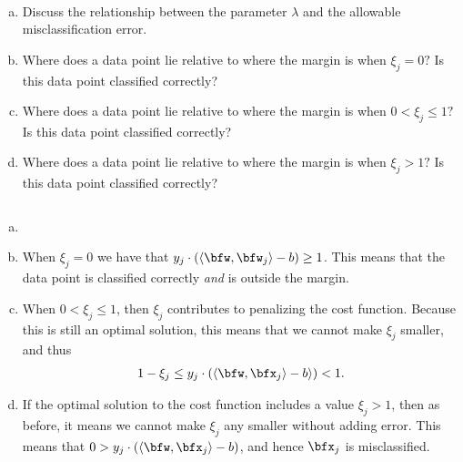 \begin{homework}[e]
\begin{align*}
  \end{align*}
    \begin{enumerate}[(a)]
      \item Discuss the relationship between the parameter $\lambda$ and the allowable misclassification error.
      \item Where does a data point lie relative to where the margin is when $\xi_j = 0?$ Is this data point classified correctly?
      \item Where does a data point lie relative to where the margin is when $0 < \xi_j \leq 1?$ Is this data point classified correctly?
      \item Where does a data point lie relative to where the margin is when $\xi_j > 1?$ Is this data point classified correctly?
    \end{enumerate}
  \begin{prf}$ $
    \begin{enumerate}[(a)]
      \item
      \item When $\xi_j = 0$ we have that $y_j\cdot (\langle \bfw,\bfw_j \rangle - b)\geq 1$. This means that the data point is classified correctly \emph{and} is outside the margin.
      \item When $0 < \xi_j \leq 1$, then $\xi_j$ contributes to penalizing the cost function. Because this is still an optimal solution, this means that we cannot make $\xi_j$ smaller, and thus
        \begin{align*}
          1 - \xi_j \leq y_j\cdot(\langle \bfw,\bfx_j\rangle - b \rangle) < 1.
        \end{align*}
      \item If the optimal solution to the cost function includes a value $\xi_j > 1$, then as before, it means we cannot make $\xi_j$ any smaller without adding error. This means that $0 > y_j\cdot (\langle \bfw,\bfx_j \rangle - b)$, and hence $\bfx_j$ is misclassified.
    \end{enumerate}
  \end{prf}
\end{homework}

